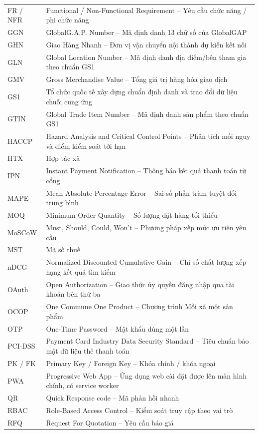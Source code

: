 \begin{longtable}{L{3.4cm} L{12cm}}
FR / NFR & Functional / Non-Functional Requirement -- Yêu cầu chức năng / phi chức năng \\
GGN & GlobalG.A.P. Number -- Mã định danh 13 chữ số của GlobalGAP \\
GHN & Giao Hàng Nhanh -- Đơn vị vận chuyển nội thành dự kiến kết nối \\
GLN & Global Location Number -- Mã định danh địa điểm/bên tham gia theo chuẩn GS1 \\
GMV & Gross Merchandise Value -- Tổng giá trị hàng hóa giao dịch \\
GS1 & Tổ chức quốc tế xây dựng chuẩn định danh và trao đổi dữ liệu chuỗi cung ứng \\
GTIN & Global Trade Item Number -- Mã định danh sản phẩm theo chuẩn GS1 \\
HACCP & Hazard Analysis and Critical Control Points -- Phân tích mối nguy và điểm kiểm soát tới hạn \\
HTX & Hợp tác xã \\
IPN & Instant Payment Notification -- Thông báo kết quả thanh toán từ cổng \\
MAPE & Mean Absolute Percentage Error -- Sai số phần trăm tuyệt đối trung bình \\
MOQ & Minimum Order Quantity -- Số lượng đặt hàng tối thiểu \\
MoSCoW & Must, Should, Could, Won't -- Phương pháp xếp mức ưu tiên yêu cầu \\
MST & Mã số thuế \\
nDCG & Normalized Discounted Cumulative Gain -- Chỉ số chất lượng xếp hạng kết quả tìm kiếm \\
OAuth & Open Authorization -- Giao thức ủy quyền đăng nhập qua tài khoản bên thứ ba \\
OCOP & One Commune One Product -- Chương trình Mỗi xã một sản phẩm \\
OTP & One-Time Password -- Mật khẩu dùng một lần \\
PCI-DSS & Payment Card Industry Data Security Standard -- Tiêu chuẩn bảo mật dữ liệu thẻ thanh toán \\
PK / FK & Primary Key / Foreign Key -- Khóa chính / khóa ngoại \\
PWA & Progressive Web App -- Ứng dụng web cài đặt được lên màn hình chính, có service worker \\
QR & Quick Response code -- Mã phản hồi nhanh \\
RBAC & Role-Based Access Control -- Kiểm soát truy cập theo vai trò \\
RFQ & Request For Quotation -- Yêu cầu báo giá \\

\end{longtable}
